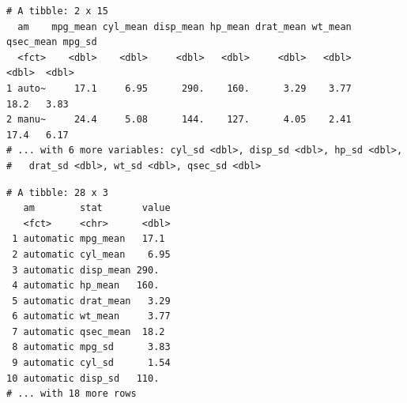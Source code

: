 \documentclass[
  11pt,
]{krantz}
\newenvironment{Shaded}{\begin{snugshade}}{\end{snugshade}}
\newcommand{\CommentTok}[1]{\textcolor[rgb]{0.37,0.37,0.37}{\textit{#1}}}
\newcommand{\DataTypeTok}[1]{\textcolor[rgb]{0.27,0.27,0.27}{#1}}
\newcommand{\KeywordTok}[1]{\textcolor[rgb]{0.27,0.27,0.27}{\textbf{#1}}}
\newcommand{\NormalTok}[1]{#1}
\newcommand{\OperatorTok}[1]{\textcolor[rgb]{0.43,0.43,0.43}{\textbf{#1}}}
\newcommand{\StringTok}[1]{\textcolor[rgb]{0.5,0.5,0.5}{#1}}
\begin{document}
\footnotesize

\begin{Shaded}
\end{Shaded}

\begin{verbatim}
# A tibble: 2 x 15
  am    mpg_mean cyl_mean disp_mean hp_mean drat_mean wt_mean qsec_mean mpg_sd
  <fct>    <dbl>    <dbl>     <dbl>   <dbl>     <dbl>   <dbl>     <dbl>  <dbl>
1 auto~     17.1     6.95      290.    160.      3.29    3.77      18.2   3.83
2 manu~     24.4     5.08      144.    127.      4.05    2.41      17.4   6.17
# ... with 6 more variables: cyl_sd <dbl>, disp_sd <dbl>, hp_sd <dbl>,
#   drat_sd <dbl>, wt_sd <dbl>, qsec_sd <dbl>
\end{verbatim}

\begin{Shaded}
\end{Shaded}

\begin{verbatim}
# A tibble: 28 x 3
   am        stat       value
   <fct>     <chr>      <dbl>
 1 automatic mpg_mean   17.1 
 2 automatic cyl_mean    6.95
 3 automatic disp_mean 290.  
 4 automatic hp_mean   160.  
 5 automatic drat_mean   3.29
 6 automatic wt_mean     3.77
 7 automatic qsec_mean  18.2 
 8 automatic mpg_sd      3.83
 9 automatic cyl_sd      1.54
10 automatic disp_sd   110.  
# ... with 18 more rows
\end{verbatim}
\end{document}
